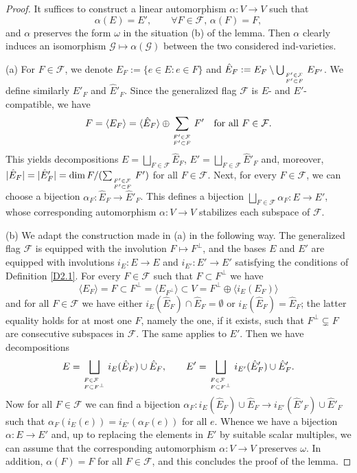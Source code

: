 \documentclass[12pt]{amsart}
\theoremstyle{definition}
\begin{document}
\begin{proof}
It suffices to construct a linear automorphism $\alpha:V\to V$ such that
$$
\alpha(E)=E',\qquad \forall F\in\mathcal{F},\, \alpha(F)=F,
$$
and $\alpha$ preserves the form $\omega$ in the situation (b) of the lemma.
Then $\alpha$ clearly induces an isomorphism $\mathcal{G}\mapsto \alpha(\mathcal{G})$ between the two considered ind-varieties.

(a) For $F\in\mathcal{F}$, we denote $E_F:=\{e\in E:e\in F\}$ and $\hat{E}_F:=E_F\setminus\bigcup_{\atop^{F'\in \mathcal{F}}_{F'\subset F}}E_{F'}$. We define similarly $E'_F$ and $\hat{E}'_F$.
Since the generalized flag $\mathcal{F}$ is $E$- and $E'$-compatible,
we have 
$$
F=\langle E_F\rangle=\langle\hat{E}_F\rangle\oplus \sum_{\atop^{F'\in \mathcal{F}}_{F'\subset F}}F'\quad\mbox{for all $F\in\mathcal{F}$.}
$$
This yields decompositions $E=\bigsqcup_{F\in\mathcal{F}}\hat{E}_F$, $E'=\bigsqcup_{F\in\mathcal{F}}\hat{E}'_F$
and, moreover, $|\hat{E}_F|=|\hat{E}'_F|=\dim F/(\sum_{\atop^{F'\in \mathcal{F}}_{F'\subset F}}F')$ for all $F\in\mathcal{F}$. Next, for every $F\in\mathcal{F}$, we can choose a bijection $\alpha_F:\hat{E}_F\to\hat{E}'_F$. This defines a bijection $\bigsqcup_{F\in\mathcal{F}}\alpha_F:E\to E'$, whose corresponding automorphism $\alpha:V\to V$ stabilizes each subspace of $\mathcal{F}$. 

(b) We adapt the construction made in (a) in the following way. 
The generalized flag $\mathcal{F}$ is equipped with the involution $F\mapsto F^\perp$,
and the bases $E$ and $E'$ are equipped with involutions $i_E:E\to E$ and $i_{E'}:E'\to E'$ satisfying the conditions of Definition \ref{D2.1}.
For every $F\in\mathcal{F}$ such that $F\subset F^\perp$ we have
$$\langle E_F\rangle=F\subset F^\perp=\langle E_{F^\perp}\rangle\subset V=F^\perp\oplus\langle i_E(E_F)\rangle$$
and for all $F\in\mathcal{F}$
 we have either $i_E(\hat{E}_F)\cap \hat{E}_F=\emptyset$ or $i_E(\hat{E}_F)=\hat{E}_F$; the latter equality holds for at most one $F$, namely the one, if it exists, such that $F^\perp \subsetneq F$ are consecutive subspaces in $\mathcal{F}$. The same applies to $E'$.
Then we have decompositions
$$
E=\bigsqcup_{\atop^{F\in\mathcal{F}}_{F\subset F^\perp}} i_E(\hat{E}_F)\cup \hat{E}_F,\qquad 
E'=\bigsqcup_{\atop^{F\in\mathcal{F}}_{F\subset F^\perp}} i_{E'}(\hat{E}'_F)\cup \hat{E}'_F.
$$
Now for all $F\in\mathcal{F}$ we can find  a bijection $\alpha_F:i_E(\hat{E}_F)\cup \hat{E}_F\to i_{E'}(\hat{E}'_F)\cup \hat{E}'_F$ such that $\alpha_F(i_E(e))=i_{E'}(\alpha_F(e))$ for all $e$. Whence we have a bijection $\alpha:E\to E'$ and, up to replacing the elements in $E'$ by suitable scalar multiples, we can assume that the corresponding automorphism $\alpha:V\to V$ preserves $\omega$. In addition, $\alpha(F)=F$ for all $F\in\mathcal{F}$, and this concludes the proof of the lemma.
\end{proof}
\end{document}
